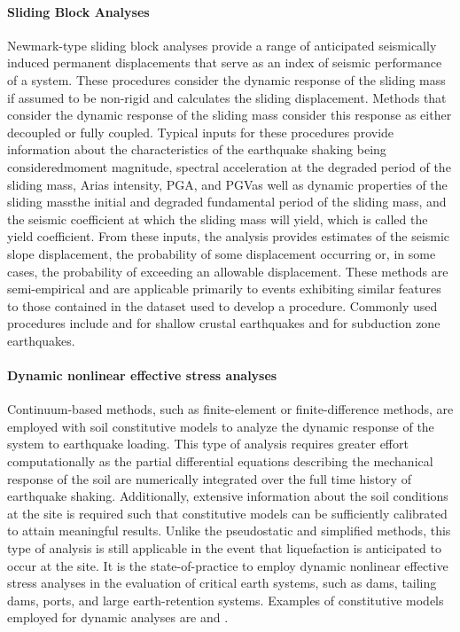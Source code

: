 \paragraph{Sliding Block Analyses} 
Newmark-type sliding block analyses provide a range of anticipated seismically induced permanent displacements that serve as an index of seismic performance of a system. These procedures consider the dynamic response of the sliding mass if assumed to be non-rigid and calculates the sliding displacement. Methods that consider the dynamic response of the sliding mass consider this response as either decoupled or fully coupled. Typical inputs for these procedures provide information about the characteristics of the earthquake shaking being considered\textemdash moment magnitude, spectral acceleration at the degraded period of the sliding mass, Arias intensity, PGA, and PGV\textemdash as well as dynamic properties of the sliding mass\textemdash the initial and degraded fundamental period of the sliding mass, and the seismic coefficient at which the sliding mass will yield, which is called the yield coefficient. From these inputs, the analysis provides estimates of the seismic slope displacement, the probability of some displacement occurring or, in some cases, the probability of exceeding an allowable displacement. These methods are semi-empirical and are applicable primarily to events exhibiting similar features to those contained in the dataset used to develop a procedure. Commonly used procedures include \cite{makdisi1978simplified, jibson2007regression, bray2007simplified, saygili2008empirical, rathje2014probabilistic} and \cite{bray2019procedure} for shallow crustal earthquakes and \cite{bray2018simplified} for subduction zone earthquakes.

\paragraph{Dynamic nonlinear effective stress analyses} 
Continuum-based methods, such as finite-element or finite-difference methods, are employed with soil constitutive models to analyze the dynamic response of the system to earthquake loading. This type of analysis requires greater effort computationally as the partial differential equations describing the mechanical response of the soil are numerically integrated over the full time history of earthquake shaking. Additionally, extensive information about the soil conditions at the site is required such that constitutive models can be sufficiently calibrated to attain meaningful results. Unlike the pseudostatic and simplified methods, this type of analysis is still applicable in the event that liquefaction is anticipated to occur at the site. It is the state-of-practice to employ dynamic nonlinear effective stress analyses in the evaluation of critical earth systems, such as dams, tailing dams, ports, and large earth-retention systems. Examples of constitutive models employed for dynamic analyses are \cite{yang2003computational, byrne2004numerical, boulanger2017pm4sand} and \cite{boulanger2018pm4silt}.

